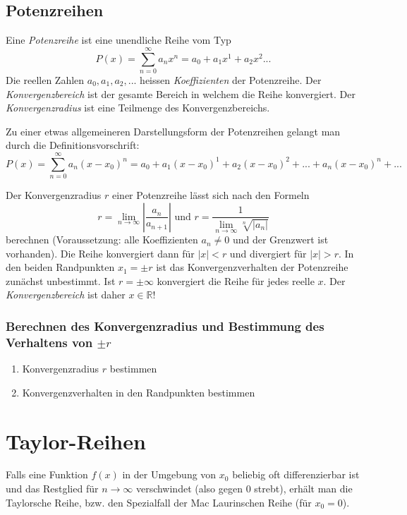 \subsection{Potenzreihen}
\begin{definition}Eine \textit{Potenzreihe} ist eine unendliche Reihe vom Typ $$P(x)= \sum\limits_{n=0}^{\infty} a_n x^n = a_0 + a_1x^1 + a_2 x^2 ...$$
Die reellen Zahlen $a_0, a_1, a_2, ...$ heissen \textit{Koeffizienten} der Potenzreihe. Der \textit{Konvergenzbereich} ist der gesamte Bereich in welchem die Reihe konvergiert. Der \textit{Konvergenzradius} ist eine Teilmenge des Konvergenzbereichs.
\end{definition}
Zu einer etwas allgemeineren Darstellungsform der Potenzreihen gelangt man durch die Definitionsvorschrift:
$$P(x) = \sum\limits_{n=0}^{\infty} a_n (x-x_0)^n = a_0 + a_1(x-x_0)^1 + a_2(x-x_0)^2 + ... + a_n(x-x_0)^n + ...$$
\begin{formel}
Der Konvergenzradius $r$ einer Potenzreihe lässt sich nach den Formeln 
$$r = \lim\limits_{n \rightarrow \infty} \left|\frac{a_n}{a_{n+1}}\right| \text{ und } r = \frac{1}{\lim\limits_{n \rightarrow \infty} \sqrt[n]{\left|a_n\right|}}$$
berechnen (Voraussetzung: alle Koeffizienten $a_n \neq 0$ und der Grenzwert ist vorhanden). Die Reihe konvergiert dann für $|x| < r$ und divergiert für $|x|>r$. In den beiden Randpunkten $x_1 = \pm r$ ist das Konvergenzverhalten der Potenzreihe zunächst unbestimmt. Ist $r = \pm \infty$ konvergiert die Reihe für jedes reelle $x$. Der \textit{Konvergenzbereich} ist daher $x \in \mathbb{R}$!
\end{formel}

\subsubsection*{Berechnen des Konvergenzradius und Bestimmung des Verhaltens von $\pm r$}
\begin{enumerate}
	\item Konvergenzradius $r$ bestimmen
	\item Konvergenzverhalten in den Randpunkten bestimmen
\end{enumerate}

\section{Taylor-Reihen}
Falls eine Funktion $f(x)$ in der Umgebung von $x_0$ beliebig oft differenzierbar ist und das Restglied für $n \rightarrow \infty$ verschwindet (also gegen 0 strebt), erhält man die Taylorsche Reihe, bzw. den Spezialfall der Mac Laurinschen Reihe (für $x_0 = 0$).

